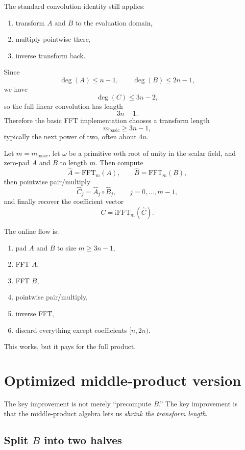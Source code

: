 \documentclass[11pt]{article}
\begin{document}
The standard convolution identity still applies:
\begin{enumerate}[itemsep=0.3em, topsep=0.4em]
  \item transform $A$ and $B$ to the evaluation domain,
  \item multiply pointwise there,
  \item inverse transform back.
\end{enumerate}

Since
\[
\deg(A) \le n-1,
\qquad
\deg(B) \le 2n-1,
\]
we have
\[
\deg(C) \le 3n-2,
\]
so the full linear convolution has length
\[
3n-1.
\]
Therefore the basic FFT implementation chooses a transform length
\[
m_{\mathrm{basic}} \ge 3n-1,
\]
typically the next power of two, often about $4n$.

Let $m = m_{\mathrm{basic}}$, let $\omega$ be a primitive $m$th root of unity in the scalar field, and zero-pad $A$ and $B$ to length $m$. Then compute
\[
\widehat{A} = \mathrm{FFT}_m(A),
\qquad
\widehat{B} = \mathrm{FFT}_m(B),
\]
then pointwise pair/multiply
\[
\widehat{C}_j = \widehat{A}_j \circ \widehat{B}_j,
\qquad j = 0,\dots,m-1,
\]
and finally recover the coefficient vector
\[
C = \mathrm{iFFT}_m(\widehat{C}).
\]

The online flow is:
\begin{enumerate}[itemsep=0.3em, topsep=0.4em]
  \item pad $A$ and $B$ to size $m \ge 3n-1$,
  \item FFT $A$,
  \item FFT $B$,
  \item pointwise pair/multiply,
  \item inverse FFT,
  \item discard everything except coefficients $[n,2n)$.
\end{enumerate}

This works, but it pays for the full product.

\section{Optimized middle-product version}

The key improvement is not merely ``precompute $B$.'' The key improvement is that the middle-product algebra lets us \emph{shrink the transform length}.

\subsection{Split $B$ into two halves}
\end{document}
